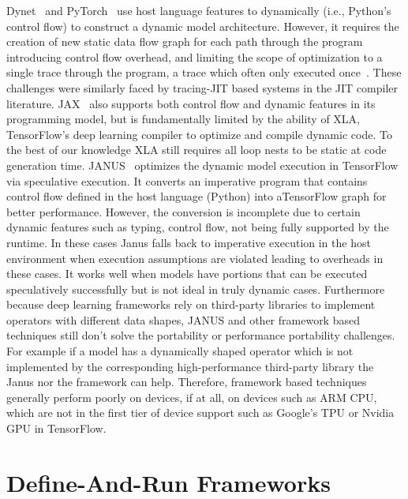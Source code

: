 Dynet~\citep{neubig2017dynet} and PyTorch~\citep{pytorch} use host language features
  to dynamically (i.e., Python's control flow) to construct a dynamic model architecture.
However, it requires the creation of new static data flow graph for each path through
  the program introducing control flow overhead, and limiting the scope of optimization
  to a single trace through the program, a trace which often only
  executed once~\citep{xu2018cavs}.
These challenges were similarly faced by tracing-JIT based systems
  in the JIT compiler literature.
JAX~\citep{jax2018github} also supports both control flow and dynamic features in its
  programming model, but is fundamentally limited by the ability
  of XLA, TensorFlow's deep learning compiler to optimize and compile dynamic code.
To the best of our knowledge XLA still requires all loop nests to be static at code generation time.
JANUS~\citep{jeong2019janus} optimizes the dynamic model execution in TensorFlow via
    speculative execution.
It converts an imperative program that contains control flow defined in the host language (Python)
  into aTensorFlow graph for better performance.
However, the conversion is incomplete due to certain dynamic features such as typing, control flow,
  not being fully supported by the runtime.
In these cases Janus falls back to imperative execution in
    the host environment when execution assumptions are violated leading
    to overheads in these cases.
It works well when models have portions that can be executed speculatively
  successfully but is not ideal in truly dynamic cases.
Furthermore because deep learning frameworks rely on third-party libraries to implement
    operators with different data shapes, JANUS and other framework based
    techniques still don't solve the portability or performance portability
    challenges.
For example if a model has a dynamically shaped operator which
  is not implemented by the corresponding high-performance third-party library
  the Janus nor the framework can help.
Therefore, framework based techniques generally perform poorly on devices, if at all,
    on devices such as ARM CPU, which are not in the first tier of device
    support such as Google's TPU or Nvidia GPU in TensorFlow.

\section{Define-And-Run Frameworks}

